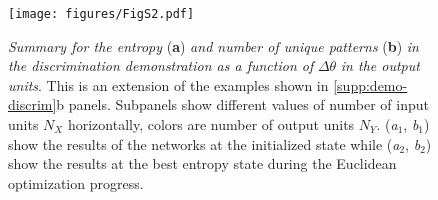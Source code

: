 \begin{figure}[H]
    \centering
    \texttt{[image: figures/FigS2.pdf]}
    \caption{
    \textit{Summary for the entropy} (\textbf{a})
    \textit{and number of unique patterns} (\textbf{b})
    \textit{in the discrimination demonstration as a function of} $\Delta \theta$
    \textit{in the output units}.
    This is an extension of the examples shown in \autoref{supp:demo-discrim}b panels.
    Subpanels show
        different values of number of input units $N_X$ horizontally,
        colors are number of output units $N_Y$.
    (\textit{a}$_1$, \textit{b}$_1$) show the results of the networks at the initialized state
        while (\textit{a}$_2$, \textit{b}$_2$) show the results at the best entropy state during the Euclidean optimization progress.
    }
    \label{supp:discrim-ent-nunq}
\end{figure}

